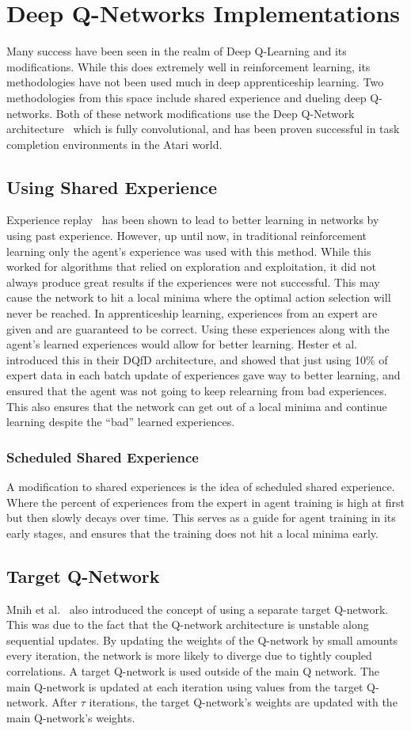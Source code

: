 \documentclass[12pt,american]{report}
\begin{document}
\section{Deep Q-Networks Implementations}
Many success have been seen in the realm of Deep Q-Learning and its modifications.  While this does extremely well in reinforcement learning, its methodologies have not been used much in deep apprenticeship learning.  Two methodologies from this space include shared experience and dueling deep Q-networks.  Both of these network modifications use the Deep Q-Network architecture~\cite{atari} which is fully convolutional, and has been proven successful in task completion environments in the Atari world.
\subsection{Using Shared Experience}
Experience replay~\cite{atari} has been shown to lead to better learning in networks by using past experience.  However, up until now, in traditional reinforcement learning only the agent's experience was used with this method.  While this worked for algorithms that relied on exploration and exploitation, it did not always produce great results if the experiences were not successful. This may cause the network to hit a local minima where the optimal action selection will never be reached. In apprenticeship learning, experiences from an expert are given and are guaranteed to be correct.  Using these experiences along with the agent's learned experiences would allow for better learning.  Hester et al.~\cite{hester2017learning} introduced this in their DQfD architecture, and showed that just using 10\% of expert data in each batch update of experiences gave way to better learning, and ensured that the agent was not going to keep relearning from bad experiences.  This also ensures that the network can get out of a local minima and continue learning despite the ``bad'' learned experiences.
\subsubsection{Scheduled Shared Experience}
A modification to shared experiences is the idea of scheduled shared experience.  Where the percent of experiences from the expert in agent training is high at first but then slowly decays over time.  This serves as a guide for agent training in its early stages, and ensures that the training does not hit a local minima early. 


\subsection{Target Q-Network}
Mnih et al.~\cite{atari} also introduced the concept of using a separate target Q-network.  This was due to the fact that the Q-network architecture is unstable along sequential updates.  By updating the weights of the Q-network by small amounts every iteration, the network is more likely to diverge due to tightly coupled correlations.  A target Q-network is used outside of the main Q network.  The main Q-network is updated at each iteration using values from the target Q-network.  After $\tau$ iterations, the target Q-network's weights are updated with the main Q-network's weights. 
\end{document}
